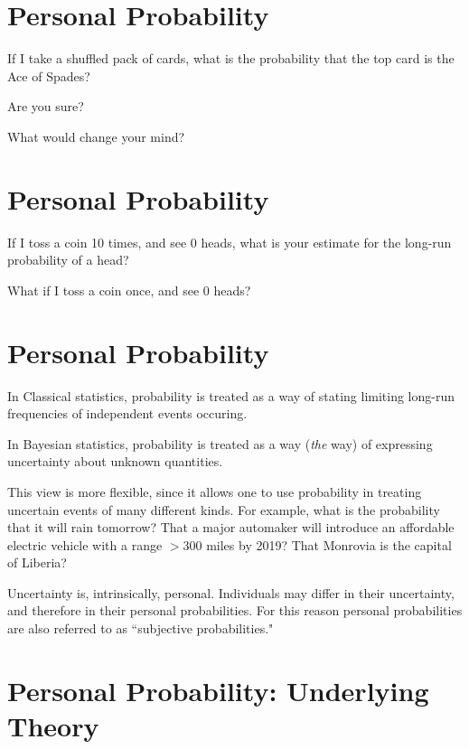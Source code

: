 
\section*{\hfil Personal Probability}

If I take a shuffled pack of cards, what is the probability
that the top card is the Ace of Spades? 

Are you sure?

What would change your mind?

\es\bs

\section*{\hfil Personal Probability}

If I toss a coin 10 times, and see 0 heads, what is your estimate
for the long-run probability of a head?

What if I toss a coin once, and see 0 heads?

\es\bs

\section*{\hfil Personal Probability}

In Classical statistics, probability is treated as a way of stating
limiting long-run frequencies of independent events occuring.

In Bayesian statistics, probability is treated as a way ({\it the} way)
of expressing uncertainty about unknown quantities.

This view is more flexible, since it allows one to use
probability in treating uncertain events of many different kinds.
For example, what is the probability 
that it will rain tomorrow? That a major automaker will introduce an
affordable electric vehicle with a range $>300$ miles by 2019?
That Monrovia is the capital of Liberia?

Uncertainty is, intrinsically, personal. Individuals may differ in their uncertainty, and therefore
in their personal probabilities.   For this reason personal probabilities are also
referred to as ``subjective probabilities." 

\es\bs

\section*{Personal Probability: Underlying Theory}

